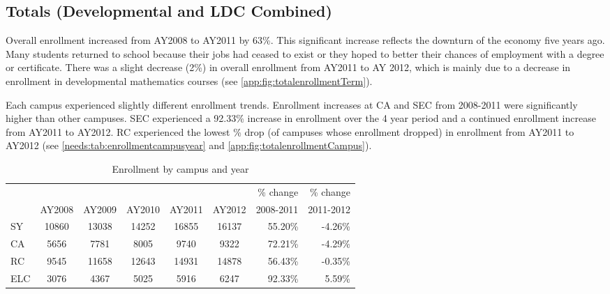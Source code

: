 \subsection{Totals (Developmental and LDC Combined)}
Overall enrollment increased from AY2008 to AY2011 by 63\%. This significant
increase reflects the downturn of the economy five years ago. Many students
returned to school because their jobs had ceased to exist or they hoped to
better their chances of employment with a degree or certificate. There was a
slight decrease (2\%) in overall enrollment from AY2011 to AY 2012, which is
mainly due to a decrease in enrollment in developmental mathematics courses
(see \vref{app:fig:totalenrollmentTerm}).

Each campus experienced slightly different enrollment trends. Enrollment
increases at CA and SEC from 2008-2011 were significantly higher than other
campuses. SEC experienced a 92.33\% increase in enrollment over the 4 year
period and a continued enrollment increase from AY2011 to AY2012. RC
experienced the lowest \% drop (of campuses whose enrollment dropped)  in
enrollment from AY2011 to AY2012 (see \vref{needs:tab:enrollmentcampusyear} and
\vref{app:fig:totalenrollmentCampus}).

\begin{table}[!htb]
	\centering
	\caption{Enrollment by campus and year}
	\label{needs:tab:enrollmentcampusyear}
	\begin{tabular}{l*{5}{c}rr}
      \toprule
		    &        &        &        &        &        & \% change & \% change \\
		    & AY2008 & AY2009 & AY2010 & AY2011 & AY2012 & 2008-2011 & 2011-2012 \\
            \midrule
		SY  & 10860  & 13038  & 14252  & 16855  & 16137  & 55.20\%   & -4.26\%   \\
		CA  & 5656   & 7781   & 8005   & 9740   & 9322   & 72.21\%   & -4.29\%   \\
		RC  & 9545   & 11658  & 12643  & 14931  & 14878  & 56.43\%   & -0.35\%   \\
		ELC & 3076   & 4367   & 5025   & 5916   & 6247   & 92.33\%   & 5.59\%    \\
        \bottomrule
	\end{tabular}
\end{table}

